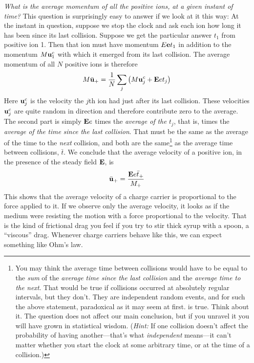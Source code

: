 \emph{What is the average momentum of all the positive ions, at a given
instant of time?} This question is surprisingly easy to answer if we
look at it this way: At the instant in question, suppose we stop the
clock and ask each ion how long it has been since its last collision.
Suppose we get the particular answer $t_1$ from positive ion 1. Then
that ion must have momentum $E\mathbf{e}t_1$ in addition to the momentum
$M\mathbf{u}_1^c$ with which it emerged from its last collision. The average
momentum of all $N$ positive ions is therefore
\begin{equation}
  M\bar{\mathbf{u}}_+ = \frac{1}{N}\sum_j\left(M\mathbf{u}_j^c+\mathbf{E}et_j\right)
\end{equation}
Here $\mathbf{u}_j^c$ is the velocity the $j$th ion had just after its last collision.
These velocities $\mathbf{u}_j^c$ are quite random in direction and therefore contribute
zero to the average. The second part is simply $\mathbf{E}e$ times the
\emph{average of the $t_j$}, that is, times the \emph{average of the time since the last
collision}. That must be the same as the average of the time to the
\emph{next} collision, and both
are the same\footnote{You may think the average time between collisions would have to be equal to the
\emph{sum} of the \emph{average time since the last collision} and the \emph{average time to the next}. That
would be true if collisions occurred at absolutely regular intervals, but they don't. They
are independent random events, and for such the above statement, paradoxical as it may
seem at first. is true. Think about it. The question does not affect our main conclusion,
but if you unravel it you will have grown in statistical wisdom. (\emph{Hint:} If one collision
doesn't affect the probability of having another---that's what \emph{independent} means---it
can't matter whether you start the clock at some arbitrary time, or at the time of a
collision.)} as the average time between
collisions, $\bar{t}$. We conclude that the average velocity of a positive ion,
in the presence of the steady field $\mathbf{E}$, is
\begin{equation}
  \bar{\mathbf{u}}_+ = \frac{\mathbf{E}e\bar{t}_+}{M_+}
\end{equation}
This shows that the average velocity of a charge carrier is proportional
to the force applied to it. If we observe only the average
velocity, it looks as if the medium were resisting the motion with a
force proportional to the velocity. That is the kind of frictional drag
you feel if you try to stir thick syrup with a spoon, a ``viscous'' drag.
Whenever charge carriers behave like this, we can expect something
like Ohm's law.

